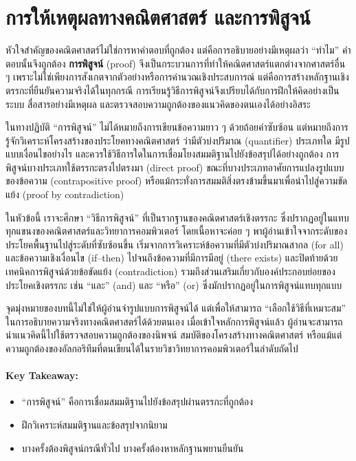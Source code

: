 \section{การให้เหตุผลทางคณิตศาสตร์ และการพิสูจน์} \label{section:proof}

หัวใจสำคัญของคณิตศาสตร์ไม่ใช่การหาคำตอบที่ถูกต้อง แต่คือการอธิบายอย่างมีเหตุผลว่า “ทำไม” คำตอบนั้นจึงถูกต้อง \textbf{การพิสูจน์} (proof) จึงเป็นกระบวนการที่ทำให้คณิตศาสตร์แตกต่างจากศาสตร์อื่น ๆ เพราะไม่ใช่เพียงการสังเกตจากตัวอย่างหรือการคำนวณเชิงประสบการณ์ แต่คือการสร้างหลักฐานเชิงตรรกะที่ยืนยันความจริงได้ในทุกกรณี การเรียนรู้วิธีการพิสูจน์จึงเปรียบได้กับการฝึกให้คิดอย่างเป็นระบบ สื่อสารอย่างมีเหตุผล และตรวจสอบความถูกต้องของแนวคิดของตนเองได้อย่างอิสระ

ในทางปฏิบัติ “การพิสูจน์” ไม่ได้หมายถึงการเขียนข้อความยาว ๆ ด้วยถ้อยคำซับซ้อน แต่หมายถึงการรู้จักวิเคราะห์โครงสร้างของประโยคทางคณิตศาสตร์ ว่ามีตัวบ่งปริมาณ (quantifier) ประเภทใด มีรูปแบบเงื่อนไขอย่างไร และควรใช้วิธีการใดในการเชื่อมโยงสมมติฐานไปยังข้อสรุปได้อย่างถูกต้อง การพิสูจน์บางประเภทใช้ตรรกะตรงไปตรงมา (direct proof) ขณะที่บางประเภทอาศัยการแปลงรูปแบบของข้อความ (contrapositive proof) หรือแม้กระทั่งการสมมติสิ่งตรงข้ามขึ้นมาเพื่อนำไปสู่ความขัดแย้ง (proof by contradiction)  

ในหัวข้อนี้ เราจะศึกษา “วิธีการพิสูจน์” ที่เป็นรากฐานของคณิตศาสตร์เชิงตรรกะ ซึ่งปรากฏอยู่ในแทบทุกแขนงของคณิตศาสตร์และวิทยาการคอมพิวเตอร์ โดยเนื้อหาจะค่อย ๆ พาผู้อ่านเข้าใจจากระดับของประโยคพื้นฐานไปสู่ระดับที่ซับซ้อนขึ้น เริ่มจากการวิเคราะห์ข้อความที่มีตัวบ่งปริมาณสากล (for all) และข้อความเชิงเงื่อนไข (if–then) ไปจนถึงข้อความที่มีการมีอยู่ (there exists) และปิดท้ายด้วยเทคนิคการพิสูจน์ด้วยข้อขัดแย้ง (contradiction) รวมถึงส่วนเสริมเกี่ยวกับองค์ประกอบย่อยของประโยคเชิงตรรกะ เช่น “และ” (and) และ “หรือ” (or) ซึ่งมักปรากฏอยู่ในการพิสูจน์แทบทุกแบบ

จุดมุ่งหมายของบทนี้ไม่ใช่ให้ผู้อ่านจำรูปแบบการพิสูจน์ได้ แต่เพื่อให้สามารถ “เลือกใช้วิธีที่เหมาะสม” ในการอธิบายความจริงทางคณิตศาสตร์ได้ด้วยตนเอง เมื่อเข้าใจหลักการพิสูจน์แล้ว ผู้อ่านจะสามารถนำแนวคิดนี้ไปใช้ตรวจสอบความถูกต้องของนิพจน์ สมบัติของโครงสร้างทางคณิตศาสตร์ หรือแม้แต่ความถูกต้องของอัลกอริทึมที่ตนเขียนได้ในรายวิชาวิทยาการคอมพิวเตอร์ในลำดับถัดไป

\paragraph*{Key Takeaway:}
\begin{itemize}
	\item “การพิสูจน์” คือการเชื่อมสมมติฐานไปยังข้อสรุปผ่านตรรกะที่ถูกต้อง
	\item ฝึกวิเคราะห์สมมติฐานและข้อสรุปจากนิยาม
	\item บางครั้งต้องพิสูจน์กรณีทั่วไป บางครั้งต้องหาหลักฐานพยานยืนยัน
\end{itemize}
